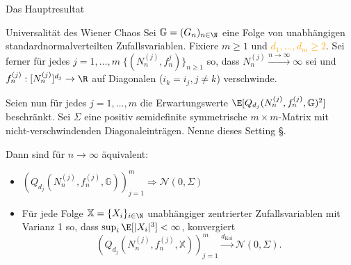 \begin{frame}{Das Hauptresultat}
    \small
    \begin{theoremblockname}{Universalität des Wiener Chaos}
        Sei $\mathbb{G} = (G_n)_{n \in \N}$ eine Folge von unabhängigen standardnormalverteilten Zufallsvariablen. 
        Fixiere $m \geq 1$ und \textcolor{orange}{$d_1, \ldots, d_m \geq 2$}. Sei ferner für jedes $j = 1, \ldots, m \; \{(N_n^{(j)}, f_n^{j})\}_{n \geq 1}$ so, dass $N_n^{(j)} \overset{n \to \infty}{\longrightarrow} \infty$ sei und $f_n^{(j)}: [N_n^{(j)}]^{d_j} \to \R$ auf Diagonalen ($i_k = i_j , j \neq k$) verschwinde. 
        \pause

        Seien nun für jedes $j = 1, \ldots, m$ die Erwartungswerte $\E[Q_{d_j}(N_n^{(j)}, f_n^{(j)}, \mathbb{G})^2]$ beschränkt. 
        Sei $\Sigma$ eine positiv semidefinite symmetrische $m\times m$-Matrix mit nicht-verschwindenden Diagonaleinträgen. Nenne dieses Setting \S.

        \pause
        Dann sind für $n \to \infty$ äquivalent: 
        \begin{itemize}
            \item[(1)] $\left(Q_{d_j}(N_n^{(j)}, f_n^{(j)}, \mathbb{G})\right)_{j=1}^m \Longrightarrow \mathcal{N}(0, \Sigma)$
            \item[(2)]  Für jede Folge $\mathbb{X} = \{X_i\}_{i \in \N}$ unabhängiger zentrierter Zufallsvariablen mit Varianz 1 so, dass $\sup_{i} \E[|X_i|^3] < \infty$, konvergiert \[
                \left(Q_{d_j}(N_n^{(j)}, f_n^{(j)}, \mathbb{X})\right)_{j=1}^m \overset{d_{\text{Kol}}}{\longrightarrow} \mathcal{N}(0, \Sigma).
            \]
        \end{itemize}
    \end{theoremblockname}
\end{frame}

